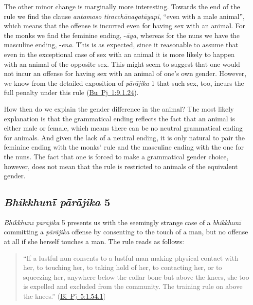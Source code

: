 \documentclass[12pt,openany]{book}%
\begin{document}
The other minor change is marginally more interesting. Towards the end of the rule we find the clause \textit{antamaso \textsanskrit{tiracchānagatāyapi}}, “even with a male animal”, which means that the offense is incurred even for having sex with an animal. For the monks we find the feminine ending, -\textit{\textsanskrit{āya}}, whereas for the nuns we have the masculine ending, -\textit{ena}. This is as expected, since it reasonable to assume that even in the exceptional case of sex with an animal it is more likely to happen with an animal of the opposite sex. This might seem to suggest that one would not incur an offense for having sex with an animal of one’s own gender. However, we know from the detailed exposition of \textit{\textsanskrit{pārājika}} 1 that such sex, too, incurs the full penalty under this rule (\href{https://suttacentral.net/pli-tv-bu-vb-pj1/en/brahmali\#9.1.24}{Bu~Pj~1:9.1.24}).

How then do we explain the gender difference in the animal? The most likely explanation is that the grammatical ending reflects the fact that an animal is either male or female, which means there can be no neutral grammatical ending for animals. And given the lack of a neutral ending, it is only natural to pair the feminine ending with the monks’ rule and the masculine ending with the one for the nuns. The fact that one is forced to make a grammatical gender choice, however, does not mean that the rule is restricted to animals of the equivalent gender.

\subsection*{\textit{\textsanskrit{Bhikkhunī} \textsanskrit{pārājika}} 5}

\textit{\textsanskrit{Bhikkhunī} \textsanskrit{pārājika}} 5 presents us with the seemingly strange case of a \textit{\textsanskrit{bhikkhunī}} committing a \textit{\textsanskrit{pārājika}} offense by consenting to the touch of a man, but no offense at all if she herself touches a man. The rule reads as follows:

\begin{quotation}%
“If a lustful nun consents to a lustful man making physical contact with her, to touching her, to taking hold of her, to contacting her, or to squeezing her, anywhere below the collar bone but above the knees, she too is expelled and excluded from the community. The training rule on above the knees.” (\href{https://suttacentral.nethttps://suttacentral.net/pli-tv-bi-vb-pj5/en/brahmali/en/brahmali\#1.54.1}{Bi~Pj~5:1.54.1})

%
\end{quotation}
\end{document}
